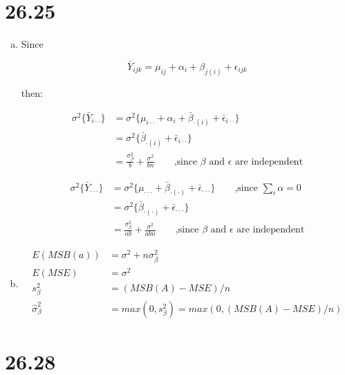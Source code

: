 \documentclass{article}\usepackage[]{graphicx}\usepackage[]{color}
\begin{document}
\section{26.25}

\begin{enumerate}[(a)]

\item

Since

$$\bar{Y}_{ijk} = \mu_{ij} + \alpha_i + \beta_{j (i)} + \epsilon_{ijk}$$

then:

\begin{displaymath}
\begin{split}
\sigma^2 \{ \bar{Y}_{i\cdot\cdot} \} &= \sigma^2 \{ \mu_{i\cdot\cdot} + \alpha_i + \bar{\beta}_{\cdot (i)} + \bar{\epsilon}_{i\cdot\cdot} \} \\
                        &= \sigma^2 \{ \bar{\beta}_{\cdot (i)} + \bar{\epsilon}_{i\cdot\cdot} \} \\
                        &= \frac{\sigma^2_{\beta}}{b} + \frac{\sigma^2}{bn}  \qquad \text{,since $\beta$ and $\epsilon$ are independent}
\end{split}
\end{displaymath}

\begin{displaymath}
\begin{split}
\sigma^2 \{ \bar{Y}_{\cdot\cdot\cdot} \} &= \sigma^2 \{ \mu_{\cdot\cdot\cdot}  + \bar{\beta}_{\cdot (\cdot)} + \bar{\epsilon}_{\cdot\cdot\cdot} \} \qquad \text{,since $\sum_i \alpha=0$}\\
                        &= \sigma^2 \{ \bar{\beta}_{\cdot (\cdot)} + \bar{\epsilon}_{\cdot\cdot\cdot} \} \\
                        &= \frac{\sigma^2_{\beta}}{ab} + \frac{\sigma^2}{abn}  \qquad \text{,since $\beta$ and $\epsilon$ are independent}
\end{split}
\end{displaymath}

\item

\begin{displaymath}
\begin{split}
E(MSB(a)) &= \sigma^2 + n\sigma^2_{\beta}\\
E(MSE) &= \sigma^2 \\
s^2_\beta &= (MSB(A)-MSE)/n\\
\hat{\sigma}_\beta^2 &= max(0, s^2_\beta) = max(0, (MSB(A)-MSE)/n)
\end{split}
\end{displaymath}

\end{enumerate}

\section{26.28}
\end{document}
